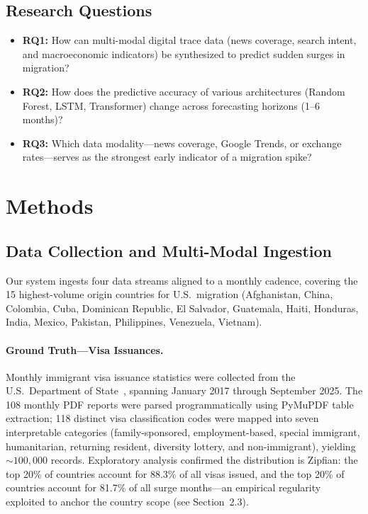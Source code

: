 \documentclass[11pt, a4paper]{article}
\begin{document}
\subsection{Research Questions}

\begin{itemize}
  \item \textbf{RQ1:} How can multi-modal digital trace data (news coverage, search
        intent, and macroeconomic indicators) be synthesized to predict sudden surges
        in migration?
  \item \textbf{RQ2:} How does the predictive accuracy of various architectures
        (Random Forest, LSTM, Transformer) change across forecasting horizons
        (1--6 months)?
  \item \textbf{RQ3:} Which data modality---news coverage, Google Trends, or exchange
        rates---serves as the strongest early indicator of a migration spike?
\end{itemize}


\section{Methods}

\subsection{Data Collection and Multi-Modal Ingestion}

Our system ingests four data streams aligned to a monthly cadence, covering the 15
highest-volume origin countries for U.S.\ migration (Afghanistan, China, Colombia, Cuba,
Dominican Republic, El Salvador, Guatemala, Haiti, Honduras, India, Mexico, Pakistan,
Philippines, Venezuela, Vietnam).

\paragraph{Ground Truth---Visa Issuances.}\label{sec:data_collection}
Monthly immigrant visa issuance statistics were collected from the U.S.\ Department of
State~\citep{state_dept_visa}, spanning January 2017 through September 2025.  The 108
monthly PDF reports were parsed programmatically using PyMuPDF table extraction; 118
distinct visa classification codes were mapped into seven interpretable categories
(family-sponsored, employment-based, special immigrant, humanitarian, returning
resident, diversity lottery, and non-immigrant), yielding ${\sim}100{,}000$ records.
Exploratory analysis confirmed the distribution is Zipfian: the top 20\% of countries
account for 88.3\% of all visas issued, and the top 20\% of countries account for
81.7\% of all surge months---an empirical regularity exploited to anchor the country
scope (see Section~2.3).
\end{document}
